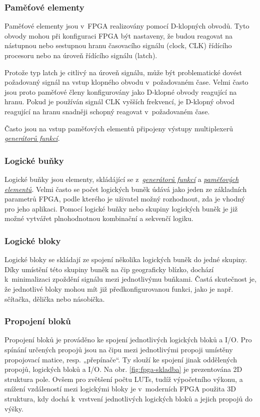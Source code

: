 \documentclass[a4paper, twoside, 11pt]{article}
\begin{document}
	\subsubsection{Paměťové elementy}\label{subsubsec:pametove-elementy}
		Paměťové elementy jsou v~FPGA realizovány pomocí D-klopných obvodů. Tyto obvody mohou při konfiguraci FPGA být nastaveny, že budou reagovat na nástupnou nebo sestupnou hranu časovacího signálu (clock, CLK) řídícího procesoru nebo na úroveň řídícího signálu (latch).\cite{Sass2010}\par
		Protože typ latch je citlivý na úroveň signálu, může být problematické dovést požadovaný signál na vstup klopného obvodu v~požadovaném čase. Velmi často jsou proto paměťové členy konfigurovány jako D-klopné obvody reagující na hranu. Pokud je používán signál CLK vyšších frekvencí, je D-klopný obvod reagující na hranu snadněji schopný reagovat v~požadovaném čase. \cite{Sass2010}\par
		Často jsou na vstup paměťových elementů připojeny výstupy multiplexerů \hyperref[subsubsec:generatory-funkci]{\textit{generátorů funkcí}}. \cite{Sass2010}

		\subsubsection{Logické buňky}
			Logické buňky jsou elementy, skládájící se z~\hyperref[subsubsec:generatory-funkci]{\textit{generátorů funkcí}} a \hyperref[subsubsec:pametove-elementy]{\textit{paměťových elementů}}. Velmi často se počet logických buněk údává jako jeden ze základních parametrů FPGA, podle kterého je uživatel možný rozhodnout, zda je vhodný pro jeho aplikaci. Pomocí logické buňky nebo skupiny logických buněk je již možné vytvářet plnohodnotnou kombinační a sekvenčí logiku.\cite{Sass2010}

		\subsubsection{Logické bloky}\label{subsubsec:logicke-bloky}
			Logické bloky se skládají ze spojení několika logických buněk do jedné skupiny. Díky umístění této skupiny buněk na čip geograficky blízko, dochází k~minimalizaci zpoždění signálu mezi jednotlivýmu buňkami. Častá skutečnost je, že jednotlivé bloky mohou mít již předkonfigurovanou funkci, jako je např. sčítačka, dělička nebo násobička. \cite{Sass2010}

		\subsubsection{Propojení bloků}
			Propojení bloků je prováděno ke spojení jednotlivých logických bloků a I/O. Pro spínání určených propojů jsou na čipu mezi jednotlivými propoji umístěny propojovací matice, resp. „přepínače“. Ty slouží ke spojení jinak oddělených propojů, logických bloků a I/O. \cite{Sass2010}
			Na obr. \ref{fig:fpga-skladba} je prezentována 2D struktura pole. Ovšem pro zvětšení počtu LUTs, tudíž výpočetního výkonu, a snížení vzdáleností mezi logickými bloky je v~moderních FPGA použita 3D struktura, kdy dochá k~vrstvení jednotlivých logických bloků a jejich propojů do výšky. \cite{pang-beginning-fpga}
\end{document}
